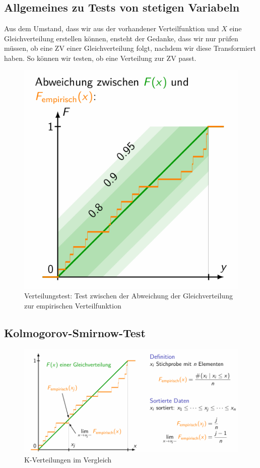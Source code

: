 \documentclass[../Main.tex]{subfiles}
\begin{document}
\subsection{Allgemeines zu Tests von stetigen Variabeln}
Aus dem Umstand, dass wir aus der vorhandener Verteilfunktion und \(X\)
eine Gleichverteilung erstellen können, ensteht der Gedanke, dass wir
nur prüfen müssen, ob eine ZV einer Gleichverteilung folgt, nachdem wir diese Transformiert haben.
So können wir testen, ob eine Verteilung zur ZV passt.

\begin{figure}[H]
    \centering
    \includegraphics[width=0.5\linewidth]{Images/verteilungs-test.png}
    \caption{Verteilungstest: Test zwischen der Abweichung der Gleichverteilung zur empirischen Verteilfunktion}
\end{figure}


\subsection{Kolmogorov-Smirnow-Test}

\begin{figure}[H]
    \centering
    \includegraphics[width=1\linewidth]{Images/k-verteilung.png}
    \caption{K-Verteilungen im Vergleich}
\end{figure}
\end{document}
